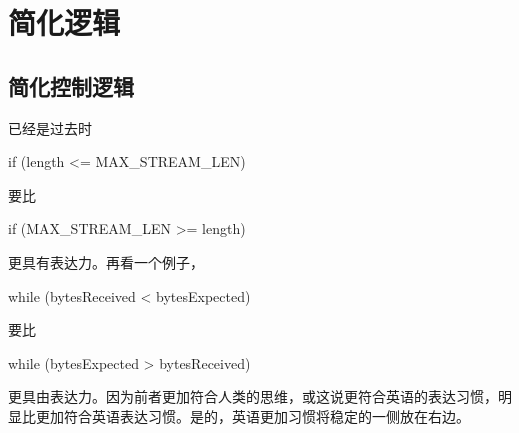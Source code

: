 \begin{savequote}[45mm]
\end{savequote}

\chapter{简化逻辑}
\label{ch:simple-logic}

\section{简化控制逻辑}

\begin{content}

\begin{advise}
已经是过去时
\end{advise}

\begin{leftbar}
\begin{c++}
if (length <= MAX_STREAM_LEN)
\end{c++}
\end{leftbar}

要比

\begin{leftbar}
\begin{c++}
if (MAX_STREAM_LEN >= length)
\end{c++}
\end{leftbar}

更具有表达力。再看一个例子，

\begin{leftbar}
\begin{c++}
while (bytesReceived < bytesExpected)
\end{c++}
\end{leftbar}

要比

\begin{leftbar}
\begin{c++}
while (bytesExpected > bytesReceived)
\end{c++}
\end{leftbar}

更具由表达力。因为前者更加符合人类的思维，或这说更符合英语的表达习惯，明显比更加符合英语表达习惯。是的，英语更加习惯将稳定的一侧放在右边。


\end{content}
